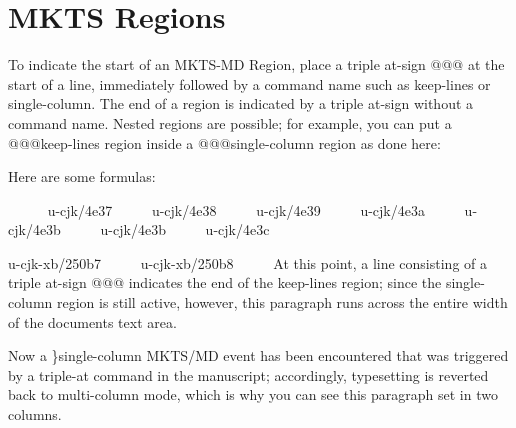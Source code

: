 \section{MKTS Regions 
}
\begin{multicols}{2}To indicate the start of an MKTS-MD Region, place a triple at-sign {\mktsStyleCode{}@@@}
at the start of a line, immediately followed by a command name such as
{\mktsStyleCode{}keep-lines} or {\mktsStyleCode{}single-column}. The end of a region is indicated by a
triple at-sign without a command name. Nested regions are possible; for example,
you can put a {\mktsStyleCode{}@@@keep-lines} region inside a {\mktsStyleCode{}@@@single-column} region as
done here:\mktsShowpar\par
\end{multicols}Here are some formulas:
\mktsShowpar\par
\begingroup{}     
{\mktsStyleCode{}u-cjk/4e37}     
{\mktsStyleCode{}u-cjk/4e38}     
{\mktsStyleCode{}u-cjk/4e39}     
{\mktsStyleCode{}u-cjk/4e3a}     
{\mktsStyleCode{}u-cjk/4e3b}     
{\mktsStyleCode{}u-cjk/4e3b}     
{\mktsStyleCode{}u-cjk/4e3c}     

{\mktsStyleCode{}u-cjk-xb/250b7}     
{\mktsStyleCode{}u-cjk-xb/250b8}     
\endgroup{}At this point, a line consisting of a triple at-sign {\mktsStyleCode{}@@@}
indicates the end of the {\mktsStyleCode{}keep-lines} region; since the
{\mktsStyleCode{}single-column} region is still active, however, {\mktsStyleItalic{}this
paragraph runs across the entire width} of the documents text
area.
\begin{multicols}{2}Now a {\mktsStyleCode{}\}single-column} MKTS/MD event has been encountered
that was triggered by a triple-at command in the manuscript;
accordingly, typesetting is reverted back to multi-column mode,
which is why you can see this paragraph set in two columns.\mktsShowpar\par
\end{multicols}\mktsShowpar\par

